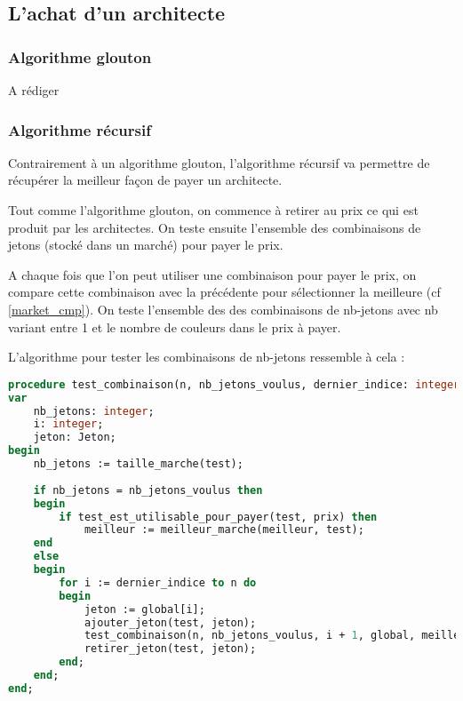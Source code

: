 
\subsection{L'achat d'un architecte}
\label{canbuy}

\subsubsection{Algorithme glouton}

A rédiger

\subsubsection{Algorithme récursif}

Contrairement à un algorithme glouton, l'algorithme récursif va permettre de récupérer la meilleur façon de payer un architecte. 

Tout comme l'algorithme glouton, on commence à retirer au prix ce qui est produit par les architectes. On teste ensuite l'ensemble des combinaisons de jetons (stocké dans un marché) pour payer le prix.

A chaque fois que l'on peut utiliser une combinaison pour payer le prix, on compare cette combinaison avec la précédente pour sélectionner la meilleure (cf \ref{market_cmp}). On teste l'ensemble des des combinaisons de nb-jetons avec nb variant entre 1 et le nombre de couleurs dans le prix à payer.

L'algorithme pour tester les combinaisons de nb-jetons ressemble à cela :

\begin{lstlisting}[language=pascal, frame=single, caption={Algorithme de test des combinaison de nb-jetons}]
procedure test_combinaison(n, nb_jetons_voulus, dernier_indice: integer; var global, meilleur, test: Marche; prix: Set);
var
    nb_jetons: integer;
    i: integer;
    jeton: Jeton;
begin
    nb_jetons := taille_marche(test);
    
    if nb_jetons = nb_jetons_voulus then
    begin
        if test_est_utilisable_pour_payer(test, prix) then
            meilleur := meilleur_marche(meilleur, test);
    end
    else
    begin
        for i := dernier_indice to n do
        begin
            jeton := global[i];
            ajouter_jeton(test, jeton);
            test_combinaison(n, nb_jetons_voulus, i + 1, global, meilleur, test, prix);
            retirer_jeton(test, jeton);
        end;
    end;
end;

\end{lstlisting}

